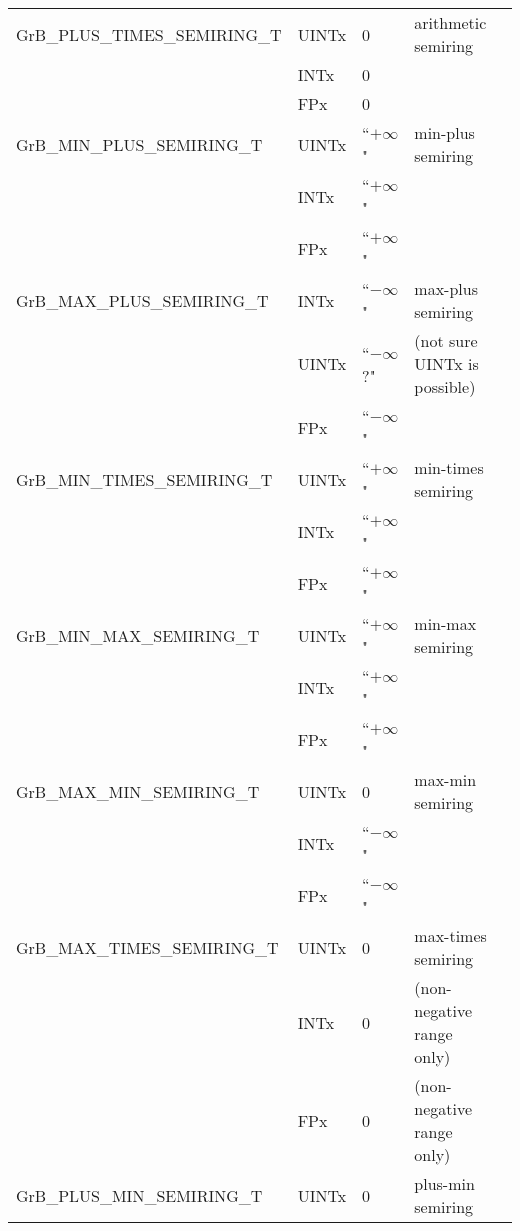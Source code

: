 \begin{table}
\begin{center}
\begin{tabular}{l|l|l|ll}
{\sf GrB\_PLUS\_TIMES\_SEMIRING\_T} & {\sf UINTx} & 0             & arithmetic semiring \\
                                    & {\sf INTx}  & 0             & \\
                                    & {\sf FPx}   & 0             & \\
{\sf GrB\_MIN\_PLUS\_SEMIRING\_T}   & {\sf UINTx} & ``$+\infty$"  & min-plus semiring \\
                                    & {\sf INTx}  & ``$+\infty$"  & \\
                                    & {\sf FPx}   & ``$+\infty$"  & \\
{\sf GrB\_MAX\_PLUS\_SEMIRING\_T}   & {\sf INTx}  & ``$-\infty$"  & max-plus semiring \\
                                    & {\sf UINTx} & ``$-\infty$?" & (not sure UINTx is possible) \\
                                    & {\sf FPx}   & ``$-\infty$"  &  \\
{\sf GrB\_MIN\_TIMES\_SEMIRING\_T}  & {\sf UINTx} & ``$+\infty$"  & min-times semiring \\
                                    & {\sf INTx}  & ``$+\infty$"  & \\
                                    & {\sf FPx}   & ``$+\infty$"  &  \\
{\sf GrB\_MIN\_MAX\_SEMIRING\_T}    & {\sf UINTx} & ``$+\infty$"  & min-max semiring \\
                                    & {\sf INTx}  & ``$+\infty$"  & \\
                                    & {\sf FPx}   & ``$+\infty$"  & \\
{\sf GrB\_MAX\_MIN\_SEMIRING\_T}    & {\sf UINTx} & 0             & max-min semiring \\
                                    & {\sf INTx}  & ``$-\infty$"  & \\
                                    & {\sf FPx}   & ``$-\infty$"  & \\
{\sf GrB\_MAX\_TIMES\_SEMIRING\_T}  & {\sf UINTx} & 0             & max-times semiring \\
                                    & {\sf INTx}  & 0             & (non-negative range only) \\
                                    & {\sf FPx}   & 0             & (non-negative range only) \\
{\sf GrB\_PLUS\_MIN\_SEMIRING\_T}   & {\sf UINTx} & 0             & plus-min semiring  \\

\end{tabular}
\end{center}
\end{table}
